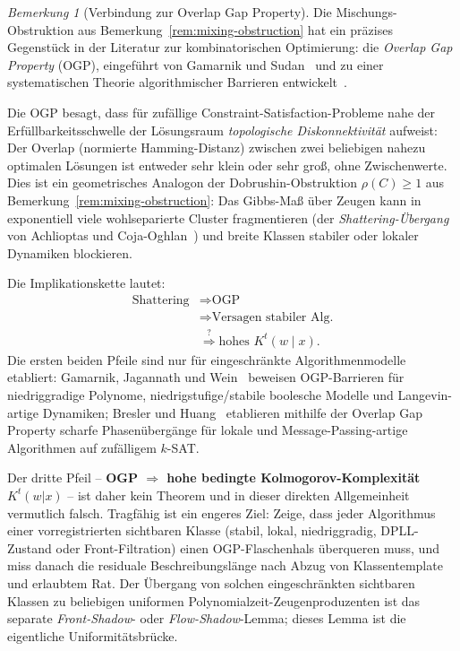 \documentclass[aps,prd,twocolumn,superscriptaddress,nofootinbib]{revtex4-2}
\theoremstyle{definition}
\theoremstyle{remark}
\newtheorem{remark}[theorem]{Bemerkung}
\begin{document}
\begin{remark}[Verbindung zur Overlap Gap Property]
\label{rem:ogp-connection}
Die Mischungs-Obstruktion aus Bemerkung~\ref{rem:mixing-obstruction} hat ein präzises Gegenstück in der Literatur zur kombinatorischen Optimierung: die \emph{Overlap Gap Property} (OGP), eingeführt von Gamarnik und Sudan~\cite{GamarnikSudan2017} und zu einer systematischen Theorie algorithmischer Barrieren entwickelt~\cite{Gamarnik2021}.

Die OGP besagt, dass für zufällige Constraint-Satisfaction-Probleme nahe der Erfüllbarkeitsschwelle der Lösungsraum \emph{topologische Diskonnektivität} aufweist: Der Overlap (normierte Hamming-Distanz) zwischen zwei beliebigen nahezu optimalen Lösungen ist entweder sehr klein oder sehr groß, ohne Zwischenwerte. Dies ist ein geometrisches Analogon der Dobrushin-Obstruktion $\rho(C) \geq 1$ aus Bemerkung~\ref{rem:mixing-obstruction}: Das Gibbs-Maß über Zeugen kann in exponentiell viele wohlseparierte Cluster fragmentieren (der \emph{Shattering-Übergang} von Achlioptas und Coja-Oghlan~\cite{AchlioptasCO2008}) und breite Klassen stabiler oder lokaler Dynamiken blockieren.

Die Implikationskette lautet:
\[
\begin{aligned}
\text{Shattering}
&\Rightarrow \text{OGP}\\
&\Rightarrow \text{Versagen stabiler Alg.}\\
&\stackrel{?}{\Rightarrow} \text{hohes } K^t(w \mid x).
\end{aligned}
\]
Die ersten beiden Pfeile sind nur für eingeschränkte Algorithmenmodelle etabliert: Gamarnik, Jagannath und Wein~\cite{GamarnikJW2020} beweisen OGP-Barrieren für niedriggradige Polynome, niedrigstufige/stabile boolesche Modelle und Langevin-artige Dynamiken; Bresler und Huang~\cite{BreslerHuang2022} etablieren mithilfe der Overlap Gap Property scharfe Phasenübergänge für lokale und Message-Passing-artige Algorithmen auf zufälligem $k$-SAT.

Der dritte Pfeil -- \textbf{OGP $\Rightarrow$ hohe bedingte Kolmogorov-Komplexität $K^t(w|x)$} -- ist daher kein Theorem und in dieser direkten Allgemeinheit vermutlich falsch. Tragfähig ist ein engeres Ziel: Zeige, dass jeder Algorithmus einer vorregistrierten sichtbaren Klasse (stabil, lokal, niedriggradig, DPLL-Zustand oder Front-Filtration) einen OGP-Flaschenhals überqueren muss, und miss danach die residuale Beschreibungslänge nach Abzug von Klassentemplate und erlaubtem Rat. Der Übergang von solchen eingeschränkten sichtbaren Klassen zu beliebigen uniformen Polynomialzeit-Zeugenproduzenten ist das separate \emph{Front-Shadow}- oder \emph{Flow-Shadow}-Lemma; dieses Lemma ist die eigentliche Uniformitätsbrücke.


\end{remark}
\end{document}
